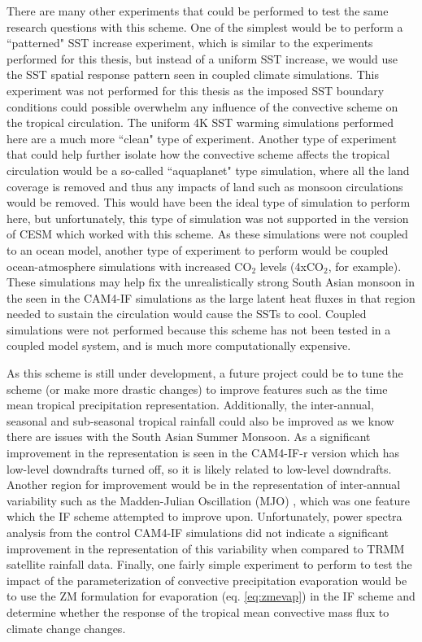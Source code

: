 \documentclass[letterpaper,12pt,titlepage,oneside,final]{book}
\begin{document}
There are many other experiments that could be performed to test the same research questions with this scheme. One of the simplest would be to perform a ``patterned" SST increase experiment, which is similar to the experiments performed for this thesis, but instead of a uniform SST  increase, we would use the SST spatial response pattern seen in coupled climate simulations. This experiment was not performed for this thesis as the imposed SST boundary conditions could possible overwhelm any influence of the convective scheme on the tropical circulation. The uniform 4K SST warming simulations performed here are a much more ``clean" type of experiment. Another type of experiment that could help further isolate how the convective scheme affects the tropical circulation would be a so-called ``aquaplanet" type simulation, where all the land coverage is removed and thus any impacts of land such as monsoon circulations would be removed. This would have been the ideal type of simulation to perform here, but unfortunately, this type of simulation was not supported in the version of CESM which worked with this scheme.
As these simulations were not coupled to an ocean model, another type of experiment to perform would be coupled ocean-atmosphere simulations with increased CO$_{2}$ levels (4xCO$_{2}$, for example). These simulations may help fix the unrealistically strong South Asian monsoon in the seen in the CAM4-IF simulations as the large latent heat fluxes in that region needed to sustain the circulation would cause the SSTs to cool. Coupled simulations were not performed because this scheme has not been tested in a coupled model system, and is much more computationally expensive.

As this scheme is still under development, a future project could be to tune the scheme (or make more drastic changes) to improve features such as the time mean tropical precipitation representation. Additionally, the inter-annual, seasonal and sub-seasonal tropical rainfall could also be improved as we know there are issues with the South Asian Summer Monsoon. As a significant improvement in the representation is seen in the CAM4-IF-r version which has low-level downdrafts turned off, so it is likely related to low-level downdrafts. Another region for improvement would be in the representation of inter-annual variability such as the Madden-Julian Oscillation (MJO) \citep{madden_detection_1971,madden_description_1972,zhang_madden-julian_2005}, which was one feature which the IF scheme attempted to improve upon. Unfortunately, power spectra analysis from the control CAM4-IF simulations did not indicate a significant improvement in the representation of this variability when compared to TRMM satellite rainfall data. Finally, one fairly simple experiment to perform to test the impact of the parameterization of convective precipitation evaporation would be to use the ZM formulation for evaporation (eq. \ref{eq:zmevap}) in the IF scheme and determine whether the response of the tropical mean convective mass flux to climate change changes.
\end{document}
